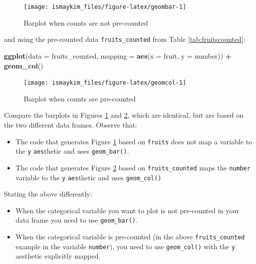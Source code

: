 \documentclass[12pt,]{krantz}
\makeatletter
\newenvironment{Shaded}{\begin{snugshade}}{\end{snugshade}}
\newcommand{\KeywordTok}[1]{\textcolor[rgb]{0.27,0.27,0.27}{\textbf{#1}}}
\newcommand{\DataTypeTok}[1]{\textcolor[rgb]{0.27,0.27,0.27}{#1}}
\newcommand{\StringTok}[1]{\textcolor[rgb]{0.5,0.5,0.5}{#1}}
\newcommand{\OperatorTok}[1]{\textcolor[rgb]{0.43,0.43,0.43}{\textbf{#1}}}
\newcommand{\NormalTok}[1]{#1}
\providecommand{\tightlist}{%
  \setlength{\itemsep}{0pt}\setlength{\parskip}{0pt}}
\newenvironment{kframe}{%
\medskip{}
\setlength{\fboxsep}{.8em}
 \def\at@end@of@kframe{}%
 \ifinner\ifhmode%
  \def\at@end@of@kframe{\end{minipage}}%
  \begin{minipage}{\columnwidth}%
 \fi\fi%
 \def\FrameCommand##1{\hskip\@totalleftmargin \hskip-\fboxsep
 \colorbox{shadecolor}{##1}\hskip-\fboxsep
     \hskip-\linewidth \hskip-\@totalleftmargin \hskip\columnwidth}%
 \MakeFramed {\advance\hsize-\width
   \@totalleftmargin\z@ \linewidth\hsize
   \@setminipage}}%
 {\par\unskip\endMakeFramed%
 \at@end@of@kframe}
\renewenvironment{Shaded}{\begin{kframe}}{\end{kframe}}
\makeatother
\begin{document}
\begin{figure}

{\centering \texttt{[image: ismaykim\_files/figure-latex/geombar-1]} 

}

\caption{Barplot when counts are not pre-counted}\label{fig:geombar}
\end{figure}

and using the pre-counted data \texttt{fruits\_counted} from Table
\ref{tab:fruitscounted}:

\begin{Shaded}
\begin{Highlighting}[]
\KeywordTok{ggplot}\NormalTok{(}\DataTypeTok{data =}\NormalTok{ fruits_counted, }\DataTypeTok{mapping =} \KeywordTok{aes}\NormalTok{(}\DataTypeTok{x =}\NormalTok{ fruit, }\DataTypeTok{y =}\NormalTok{ number)) }\OperatorTok{+}
\StringTok{  }\KeywordTok{geom_col}\NormalTok{()}
\end{Highlighting}
\end{Shaded}

\begin{figure}

{\centering \texttt{[image: ismaykim\_files/figure-latex/geomcol-1]} 

}

\caption{Barplot when counts are pre-counted}\label{fig:geomcol}
\end{figure}

Compare the barplots in Figures \ref{fig:geombar} and \ref{fig:geomcol},
which are identical, but are based on the two different data frames.
Observe that:

\begin{itemize}
\tightlist
\item
  The code that generates Figure \ref{fig:geombar} based on
  \texttt{fruits} does not map a variable to the \texttt{y}
  \texttt{aes}thetic and uses \texttt{geom\_bar()}.
\item
  The code that generates Figure \ref{fig:geomcol} based on
  \texttt{fruits\_counted} maps the \texttt{number} variable to the
  \texttt{y} \texttt{aes}thetic and uses \texttt{geom\_col()}
\end{itemize}

Stating the above differently:

\begin{itemize}
\tightlist
\item
  When the categorical variable you want to plot is not pre-counted in
  your data frame you need to use \texttt{geom\_bar()}.
\item
  When the categorical variable is pre-counted (in the above
  \texttt{fruits\_counted} example in the variable \texttt{number}), you
  need to use \texttt{geom\_col()} with the \texttt{y} aesthetic
  explicitly mapped.
\end{itemize}
\end{document}
